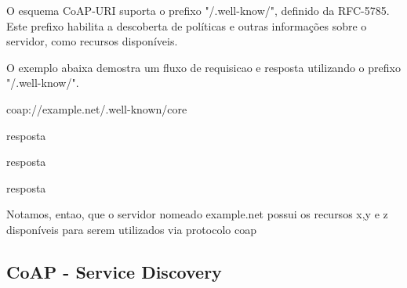 O esquema CoAP-URI suporta o prefixo "/.well-know/", definido da RFC-5785\cite{rfc5785}.
Este prefixo habilita a descoberta de políticas e outras informações sobre o servidor, como recursos disponíveis.

O exemplo abaixa demostra um fluxo de requisicao e resposta utilizando o prefixo "/.well-know/".

coap://example.net/.well-known/core

resposta

resposta

resposta

Notamos, entao, que o servidor nomeado example.net possui os recursos x,y e z disponíveis para serem utilizados via protocolo coap


\subsection{CoAP - Service Discovery}





